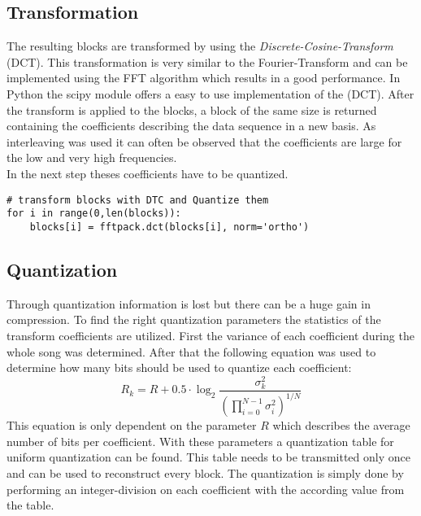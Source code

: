 \documentclass[10pt]{article}
\begin{document}
\subsection{Transformation}
The resulting blocks are transformed by using the \textit{Discrete-Cosine-Transform} (DCT).
This transformation is very similar to the Fourier-Transform and can be implemented using the FFT algorithm which results in a good performance.
In Python the scipy module offers a easy to use implementation of the (DCT). 
After the transform is applied to the blocks, a block of the same size is returned containing the coefficients describing the data sequence in a new basis.
As interleaving was used it can often be observed that the coefficients are large for the low and very high frequencies.\\
In the next step theses coefficients have to be quantized.

\begin{lstlisting}
# transform blocks with DTC and Quantize them
for i in range(0,len(blocks)):
	blocks[i] = fftpack.dct(blocks[i], norm='ortho')
\end{lstlisting}


\subsection{Quantization}
Through quantization information is lost but there can be a huge gain in compression.
To find the right quantization parameters the statistics of the transform coefficients are utilized.
First the variance of each coefficient during the whole song was determined.
After that the following equation was used to determine how many bits should be used to quantize each coefficient:
\begin{equation}
	R_{k} = R + 0.5 \cdot \log_2{\frac{\sigma_k^2}{(\prod_{i=0}^{N-1} \sigma_i^2)^{1/N}}}
\end{equation}
This equation is only dependent on the parameter $R$ which describes the average number of bits per coefficient.
With these parameters a quantization table for uniform quantization can be found.
This table needs to be transmitted only once and can be used to reconstruct every block.
The quantization is simply done by performing an integer-division on each coefficient with the according value from the table.
\end{document}
